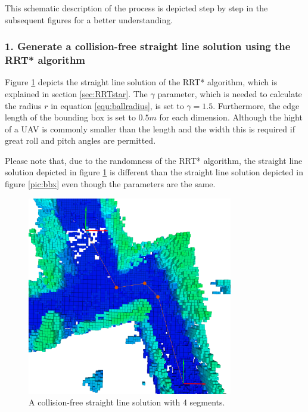 This schematic description of the process is depicted step by step in the subsequent figures for a better understanding.

\subsubsection{1. Generate a collision-free straight line solution using the RRT* algorithm}

Figure \ref{pic:RRTstepOne} depicts the straight line solution of the RRT* algorithm, which is explained in section \ref{sec:RRTstar}.  The $\gamma$ parameter, which is needed to calculate the radius $r$ in equation \ref{equ:ballradius}, is set to $\gamma = 1.5$. Furthermore, the edge length of the bounding box is set to $0.5m$ for each dimension. Although the hight of a UAV is commonly smaller than the length and the width this is required if great roll and pitch angles are permitted. \newline


Please note that, due to the randomness of the RRT* algorithm, the straight line solution depicted in figure  \ref{pic:RRTstepOne} is different than the straight line solution depicted in figure \ref{pic:bbx} even though the parameters are the same. 

\begin{figure}[h]
   \centering
   \includegraphics[trim = 45mm 0mm 35mm 0mm,clip,width=0.8\textwidth]{pics/extensionLongP.png}
   \caption{A collision-free straight line solution with 4 segments.}
   \label{pic:RRTstepOne}
\end{figure}


